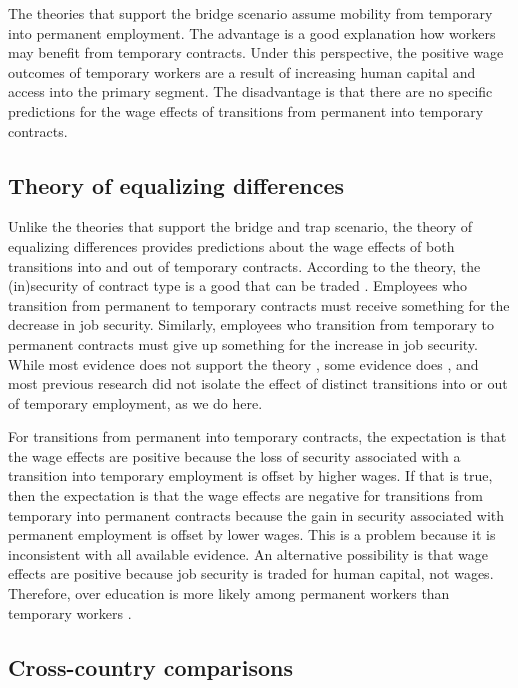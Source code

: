 \documentclass[12pt]{article}
\begin{document}
The theories that support the bridge scenario assume mobility from temporary into permanent employment.  The advantage is a good explanation how workers may benefit from temporary contracts.  Under this perspective, the positive wage outcomes of temporary workers are a result of increasing human capital and access into the primary segment.  The disadvantage is that there are no specific predictions for the wage effects of transitions from permanent into temporary contracts.  

\subsection{Theory of equalizing differences}

Unlike the theories that support the bridge and trap scenario, the theory of equalizing differences provides predictions about the wage effects of both transitions into and out of temporary contracts.  According to the theory, the (in)security of contract type is a good that can be traded \citep{rosen_theory_1986}.  Employees who transition from permanent to temporary contracts must receive something for the decrease in job security.  Similarly, employees who transition from temporary to permanent contracts must give up something for the increase in job security.  While most evidence does not support the theory \citep{de_graaf-zijl_compensation_2012,hagen_temporary_2002}, some evidence does \citep{albanese2020buy}, and most previous research did not isolate the effect of distinct transitions into or out of temporary employment, as we do here.  

For transitions from permanent into temporary contracts, the expectation is that the wage effects are positive because the loss of security associated with a transition into temporary employment is offset by higher wages.  If that is true, then the expectation is that the wage effects are negative for transitions from temporary into permanent contracts because the gain in security associated with permanent employment is offset by lower wages.  This is a problem because it is inconsistent with all available evidence.  An alternative possibility is that wage effects are positive because job security is traded for human capital, not wages.  Therefore, over education is more likely among permanent workers than temporary workers \citep{ortiz2010not,ortiz2018overeducation}.  

\subsection{Cross-country comparisons}\label{subsec:country}
\end{document}
